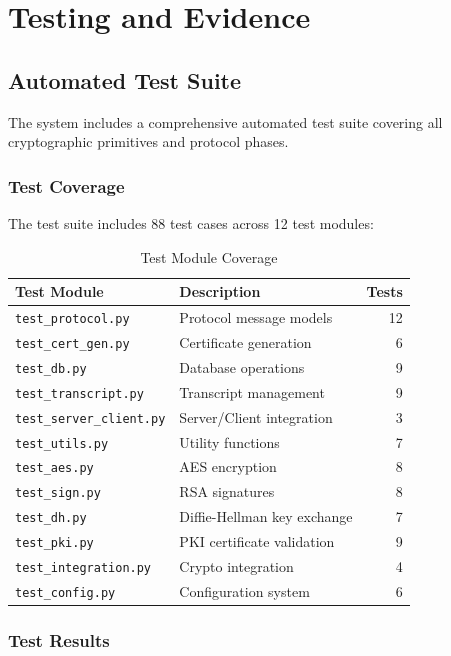 \documentclass[runningheads]{llncs}
\begin{document}
\section{Testing and Evidence}

\subsection{Automated Test Suite}

The system includes a comprehensive automated test suite covering all cryptographic primitives and protocol phases.

\subsubsection{Test Coverage}

The test suite includes 88 test cases across 12 test modules:

\begin{table}[h]
\centering
\begin{tabular}{@{}llr@{}}
\toprule
\textbf{Test Module} & \textbf{Description} & \textbf{Tests} \\
\midrule
\texttt{test\_protocol.py} & Protocol message models & 12 \\
\texttt{test\_cert\_gen.py} & Certificate generation & 6 \\
\texttt{test\_db.py} & Database operations & 9 \\
\texttt{test\_transcript.py} & Transcript management & 9 \\
\texttt{test\_server\_client.py} & Server/Client integration & 3 \\
\texttt{test\_utils.py} & Utility functions & 7 \\
\texttt{test\_aes.py} & AES encryption & 8 \\
\texttt{test\_sign.py} & RSA signatures & 8 \\
\texttt{test\_dh.py} & Diffie-Hellman key exchange & 7 \\
\texttt{test\_pki.py} & PKI certificate validation & 9 \\
\texttt{test\_integration.py} & Crypto integration & 4 \\
\texttt{test\_config.py} & Configuration system & 6 \\
\bottomrule
\end{tabular}
\caption{Test Module Coverage}
\label{tab:test-coverage}
\end{table}

\subsubsection{Test Results}
\end{document}
